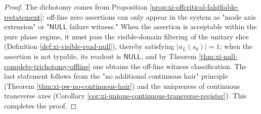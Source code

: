 \begin{proof}
The dichotomy comes from Proposition \ref{prop:xi-offcritical-falsifiable-restatement}: off-line zero assertions can only appear in the system as "mode axis extension" or "\(\mathsf{NULL}\) failure witness."
When the assertion is acceptable within the pure phase regime, it must pass the visible-domain filtering of the unitary slice (Definition \ref{def:xi-visible-read-null}), thereby satisfying \(|u_L(s_0)|=1\); when the assertion is not typable, its readout is \(\mathsf{NULL}\), and by Theorem \ref{thm:xi-null-complete-trichotomy-offline} one obtains the off-line witness classification.
The last statement follows from the "no additional continuous hair" principle (Theorem \ref{thm:xi-pw-no-continuous-hair}) and the uniqueness of continuous transverse axes (Corollary \ref{cor:xi-unique-continuous-transverse-register}). This completes the proof.
\end{proof}

